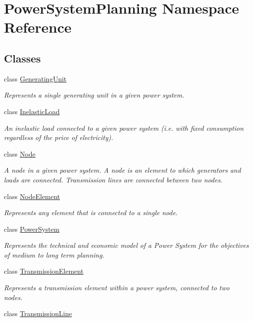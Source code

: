 \hypertarget{namespace_power_system_planning}{}\section{Power\+System\+Planning Namespace Reference}
\label{namespace_power_system_planning}
\subsection*{Classes}
\begin{DoxyCompactItemize}
\item 
class \hyperlink{class_power_system_planning_1_1_generating_unit}{Generating\+Unit}
\begin{DoxyCompactList}\small\item\em Represents a single generating unit in a given power system. \end{DoxyCompactList}\item 
class \hyperlink{class_power_system_planning_1_1_inelastic_load}{Inelastic\+Load}
\begin{DoxyCompactList}\small\item\em An inelastic load connected to a given power system (i.\+e. with fixed consumption regardless of the price of electricity). \end{DoxyCompactList}\item 
class \hyperlink{class_power_system_planning_1_1_node}{Node}
\begin{DoxyCompactList}\small\item\em A node in a given power system. A node is an element to which generators and loads are connected. Transmission lines are connected between two nodes. \end{DoxyCompactList}\item 
class \hyperlink{class_power_system_planning_1_1_node_element}{Node\+Element}
\begin{DoxyCompactList}\small\item\em Represents any element that is connected to a single node. \end{DoxyCompactList}\item 
class \hyperlink{class_power_system_planning_1_1_power_system}{Power\+System}
\begin{DoxyCompactList}\small\item\em Represents the technical and economic model of a Power System for the objectives of medium to long term planning. \end{DoxyCompactList}\item 
class \hyperlink{class_power_system_planning_1_1_transmission_element}{Transmission\+Element}
\begin{DoxyCompactList}\small\item\em Represents a transmission element within a power system, connected to two nodes. \end{DoxyCompactList}\item 
class \hyperlink{class_power_system_planning_1_1_transmission_line}{Transmission\+Line}
\end{DoxyCompactItemize}
